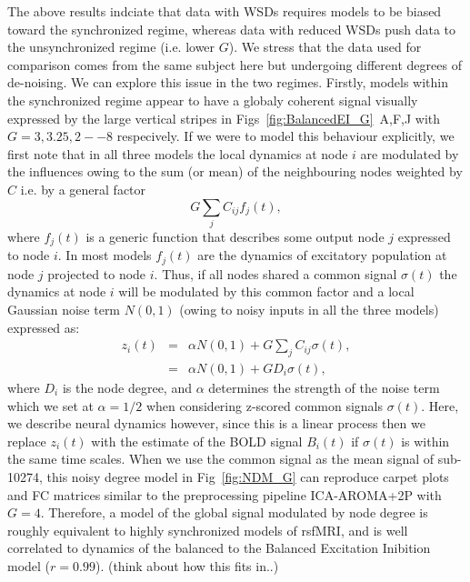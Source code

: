 \documentclass[oneside]{zHenriquesLab-StyleBioRxiv}
\begin{document}
The above results indciate that data with WSDs requires models to be biased toward the synchronized regime, whereas data with reduced WSDs push data to the unsynchronized regime (i.e. lower $G$). We stress that the data used for comparison comes from the same subject here but undergoing different degrees of de-noising. We can explore this issue in the two regimes. Firstly, models within the synchronized regime appear to have a globaly coherent signal visually expressed by the large vertical stripes in Figs~\ref{fig:BalancedEI_G}~A,F,J with $G=3,3.25,2--8$ respecively. If we were to model this behaviour explicitly, we first note that in all three models the local dynamics at node $i$ are modulated by the influences owing to the sum (or mean) of the neighbouring nodes weighted by $C$ i.e. by a general factor
\begin{equation}
G\sum_jC_{ij}f_{j}(t),
\end{equation}
where $f_{j}(t)$ is a generic function that describes some output node $j$ expressed to node $i$. In most models $f_{j}(t)$ are the dynamics of excitatory population at node $j$ projected to node $i$. Thus, if all nodes shared a common signal $\sigma(t)$ the dynamics at node $i$ will be modulated by this common factor and a local Gaussian noise term $N(0,1)$ (owing to noisy inputs in all the three models) expressed as:
\begin{eqnarray}
z_i(t) &=& \alpha N(0,1) + G\sum_jC_{ij}\sigma(t),\\
	   &=& \alpha N(0,1) + GD_{i}\sigma(t),
\end{eqnarray}
where $D_i$ is the node degree, and $\alpha$ determines the strength of the noise term which we set at $\alpha=1/2$ when considering z-scored common signals $\sigma(t)$. Here, we describe neural dynamics however, since this is a linear process then we replace $z_i(t)$ with the estimate of the BOLD signal $B_i(t)$ if $\sigma(t)$ is within the same time scales. When we use the common signal as the mean signal of sub-10274, this noisy degree model in Fig~\ref{fig:NDM_G} can reproduce carpet plots and FC matrices similar to the preprocessing pipeline ICA-AROMA+2P with $G=4$. Therefore, a model of the global signal modulated by node degree is roughly equivalent to highly synchronized models of rsfMRI, and is well correlated to dynamics of the balanced to the Balanced Excitation Inibition model ($r=0.99$). (think about how this fits in..)
\end{document}
